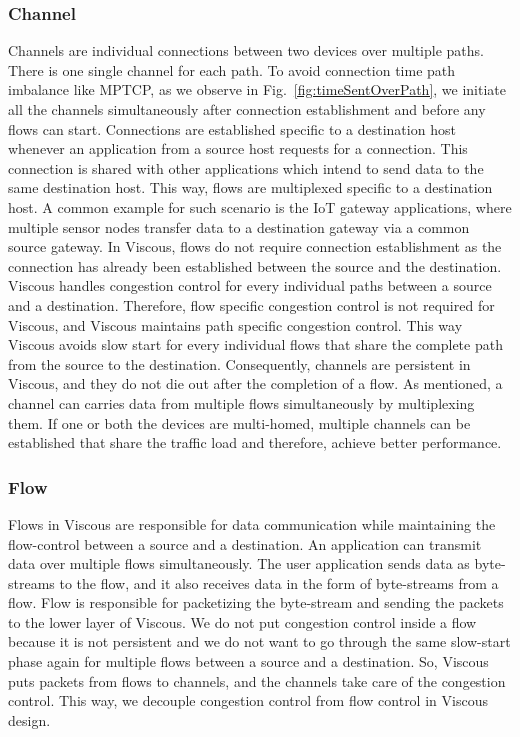 \subsubsection{Channel}
Channels are individual connections between two devices over multiple paths. There is one single channel for each path. To avoid connection time path imbalance like MPTCP, as we observe in Fig.~\ref{fig:timeSentOverPath}, we initiate all the channels simultaneously after connection establishment and before any flows can start. Connections are established specific to a destination host whenever an application from a source host requests for a connection. This connection is shared with other applications which intend to send data to the same destination host. This way, flows are multiplexed specific to a destination host. A common example for such scenario is the IoT gateway applications, where multiple sensor nodes transfer data to a destination gateway via a common source gateway. In Viscous, flows do not require connection establishment as the connection has already been established between the source and the destination. Viscous handles congestion control for every individual paths between a source and a destination. Therefore, flow specific congestion control is not required for Viscous, and Viscous maintains path specific congestion control. This way Viscous avoids slow start for every individual flows that share the complete path from the source to the destination. Consequently, channels are persistent in Viscous, and they do not die out after the completion of a flow. As mentioned, a channel can carries data from multiple flows simultaneously by multiplexing them. If one or both the devices are multi-homed, multiple channels can be established that share the traffic load and therefore, achieve better performance.

\subsubsection{Flow} 
Flows in Viscous are responsible for data communication while maintaining the flow-control between a source and a destination. An application can transmit data over multiple flows simultaneously. The user application sends data as byte-streams to the flow, and it also receives data in the form of byte-streams from a flow. Flow is responsible for packetizing the byte-stream and sending the packets to the lower layer of Viscous. We do not put congestion control inside a flow because it is not persistent and we do not want to go through the same slow-start phase again for multiple flows between a source and a destination. So, Viscous puts packets from flows to channels, and the channels take care of the congestion control. This way, we decouple congestion control from flow control in Viscous design. 

